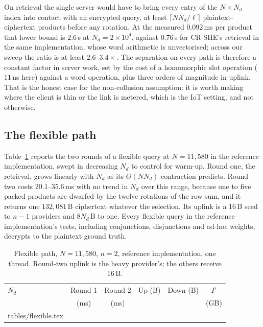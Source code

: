 \documentclass[a4paper,fleqn]{cas-sc}
\begin{document}
On retrieval the single server would have to bring every entry of the
$N\times N_d$ index into contact with an encrypted query, at least
$\lceil NN_d/\ell\rceil$ plaintext-ciphertext products before any rotation.
At the measured $0.092$\,ms per product that lower bound is $2.6$\,s at
$N_d=2\times10^4$, against $0.76$\,s for CR-SHE's retrieval in the same
implementation, whose word arithmetic is unvectorised; across our sweep the
ratio is at least $2.6$--$3.4\times$. The separation on every path is therefore
a constant factor in server work, set by the cost of a homomorphic slot
operation ($11$\,ns here) against a word operation, plus three orders of
magnitude in uplink. That is the honest case for the non-collusion assumption:
it is worth making where the client is thin or the link is metered, which is
the IoT setting, and not otherwise.

\subsection{The flexible path}
\label{sec:flexresult}
Table~\ref{tab:flex} reports the two rounds of a flexible query at
$N=11{,}580$ in the reference implementation, swept in decreasing $N_d$ to
control for warm-up. Round one, the retrieval, grows linearly with $N_d$ as
its $\Theta(NN_d)$ contraction predicts. Round two costs $20.1$--$35.6$\,ms
with no trend in $N_d$ over this range, because one to five packed products are
dwarfed by the twelve rotations of the row sum, and it returns one
$132{,}081$\,B ciphertext whatever the selection. Its uplink is a $16$\,B seed
to $n-1$ providers and $8N_d$\,B to one. Every flexible query in the reference implementation's tests, including
conjunctions, disjunctions and ad-hoc weights, decrypts to the plaintext ground
truth.

\begin{table}[pos=htbp]
\caption{Flexible path, $N=11{,}580$, $n=2$, reference implementation, one
thread. Round-two uplink is the heavy provider's; the others receive 16\,B.}
\label{tab:flex}
\centering
\footnotesize
\setlength{\tabcolsep}{2pt}
\begin{tabular*}{\tblwidth}{@{\extracolsep{\fill}}lccccc@{}}
\toprule
$N_d$ & Round 1 & Round 2 & Up (B) & Down (B) & $I'$ \\
      & (ms)    & (ms)    &        &          & (GB) \\
\midrule
{} tables/flexible.tex 
\bottomrule
\end{tabular*}
\end{table}
\end{document}
